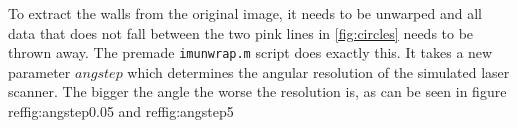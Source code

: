 \documentclass[a4paper, 20pt]{report}
\begin{document}
\begin{figure}[!ht]
\centering
\begin{floatrow}
  
\end{floatrow}
\end{figure}


To extract the walls from the original image, it needs to be unwarped and all
data that does not fall between the two pink lines in \ref{fig:circles} needs to
be thrown away. The premade \texttt{imunwrap.m} script does exactly this. It
takes a new parameter $angstep$ which determines the angular resolution of the
simulated laser scanner. The bigger the angle the worse the resolution is, as
can be seen in figure ref{fig:angstep0.05} and ref{fig:angstep5}
\end{document}
